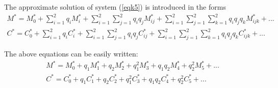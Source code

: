 \documentclass[a4paper,12pt]{article}
\begin{document}
 \noindent The approximate solution of system (\ref{eqk5}) is introduced in the forms
\begin{equation}  
\begin{array}{llll}
M^{*}=M^{*}_{0}+\sum\limits_{i=1}^{2}q_{i}M^{*}_{i}+\sum\limits_{i=1}^{2}\sum\limits_{j=1}^{2}q_{i}q_{j}M^{*}_{ij}+\sum\limits_{i=1}^{2}\sum\limits_{j=1}^{2}\sum\limits_{k=1}^{2}q_{i}q_{j}q_{k}M^{*}_{ijk}+...\\
C^{*}=C^{*}_{0}+\sum\limits_{i=1}^{2}q_{i}C^{*}_{i}+\sum\limits_{i=1}^{2}\sum\limits_{j=1}^{2}q_{i}q_{j}C^{*}_{ij}+\sum\limits_{i=1}^{2}\sum\limits_{j=1}^{2}\sum\limits_{k=1}^{2}q_{i}q_{j}q_{k}C^{*}_{ijk}+...
\end{array}\label{eqk6}
\end{equation} 

\noindent The above equations can be easily written:
\begin{equation}  
\begin{array}{llll}
M^{*}=M^{*}_{0}+q_{1}M^{*}_{1}+q_{2}M^{*}_{2}+q_{1}^{2}M^{*}_{3}+q_{1}q_{2}M^{*}_{4}+q_{2}^{2}M^{*}_{5}+...
 \\ 
C^{*}=C^{*}_{0}+q_{1}C^{*}_{1}+q_{2}C^{*}_{2}+q_{1}^{2}C^{*}_{3}+q_{1}q_{2}C^{*}_{4}+q_{2}^{2}C^{*}_{5}+...
\end{array}\label{eqk7} 
\end{equation}
\end{document}

